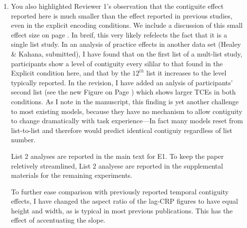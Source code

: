 \documentclass[12pt]{article}
\begin{document}
\begin{enumerate}
\item
	You also highlighted Reviewer 1's observation that the contiguite effect reported here is much smaller than the effect reported in previous studies, even in the explicit encoding conditions. We include a discussion of this small effect size on page \pageref{TODO-5}. In breif, this very likely refelects the fact that it is a single list study. In an analysis of practice effects in another data set (Healey \& Kahana, submitted), I have found that on the first list of a mult-list study, participants show a level of contiguity every sililar to that found in the Explicit condition here, and that by the $12^{th}$ list it increases to the level typically reported. In the revision, I have added an anlysis of participants' second list (see the new Figure on Page \pageref{TODO-6}) which shows larger TCEs in both conditions.  As I note in the manuscript, this finding is yet another challenge to most existing models, because they have no mechanism to allow contiguity to change dramatically with task experience---In fact many models reset from list-to-list and therefore would predict identical contiguiy regardless of list number.

	List 2 analyses are reported in the main text for E1. To keep the paper reletively streamlined, List 2 analyese are reported in the supplemental materials for the remaining experiments.

	To further ease comparison with previously reported temporal contiguity effects, I have changed the aspect ratio of the lag-CRP figures to have equal height and width, as is typical in most previous publications. This has the effect of accentuating the slope. 



\end{enumerate}
\end{document}
